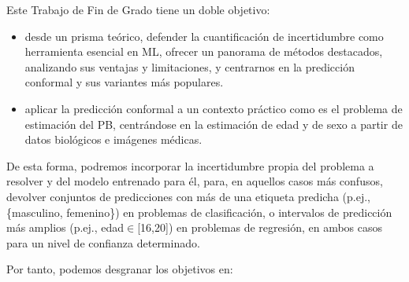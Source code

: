 Este Trabajo de Fin de Grado tiene un doble objetivo: 

\begin{itemize}

    \item desde un prisma teórico, defender la cuantificación de incertidumbre como herramienta esencial en ML, ofrecer un panorama de métodos destacados, analizando sus ventajas y limitaciones, y centrarnos en la predicción conformal y sus variantes más populares.

    \item aplicar la predicción conformal a un contexto práctico como es el problema de estimación del PB, centrándose en la estimación de edad y de sexo a partir de datos biológicos e imágenes médicas.

\end{itemize}

De esta forma, podremos incorporar la incertidumbre propia del problema a resolver y del modelo entrenado para él, para, en aquellos casos más confusos, devolver conjuntos de predicciones con más de una etiqueta predicha (p.ej., \{masculino, femenino\}) en problemas de clasificación, o intervalos de predicción más amplios (p.ej., edad$\in$[16,20]) en problemas de regresión, en ambos casos para un nivel de confianza determinado.

Por tanto, podemos desgranar los objetivos en:



